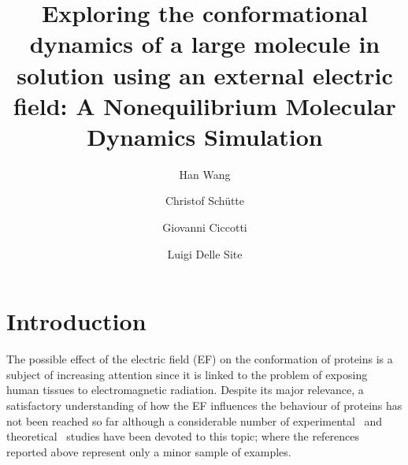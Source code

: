 \documentclass[a4paper,preprint,unsortedaddress,onecolumn]{revtex4-1}
\begin{document}
\title{Exploring the conformational dynamics of a large molecule in solution using an external electric field: A Nonequilibrium Molecular Dynamics Simulation}
\author{Han Wang}
\author{Christof Sch\"utte}
\author{Giovanni Ciccotti}
\author{Luigi Delle Site}

\begin{abstract}
\end{abstract}

\maketitle


\section{Introduction}


The possible effect of the electric field (EF) on the conformation of
proteins is a subject of increasing attention since it is linked to the problem of exposing human tissues to
electromagnetic radiation. Despite its major relevance, a
satisfactory understanding of how the EF influences the behaviour of proteins
has not been reached so far although a considerable number of
experimental~\cite{bohr2000microwave, bohr2000microwave-1,
  dePomerai2000cell, inskip2001cellular, mancinelli2004non} and
theoretical~\cite{budi2005electric, budi2007effect,
  budi2008comparative, toschi2008effects, astrakas2011electric,
  astrakas2012structural, damm2012can, starzyk2013proteins,
  english2009nonequilibrium, solomentsev2012effects} studies have been devoted to this topic;
where the references reported above represent only a minor sample of examples.
\end{document}
